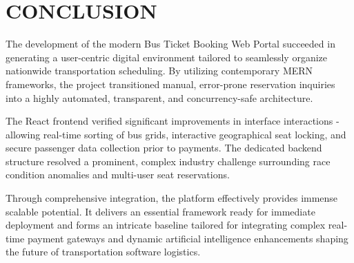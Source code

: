 \chapter{CONCLUSION}

The development of the modern Bus Ticket Booking Web Portal succeeded in generating a user-centric digital environment tailored to seamlessly organize nationwide transportation scheduling. By utilizing contemporary MERN frameworks, the project transitioned manual, error-prone reservation inquiries into a highly automated, transparent, and concurrency-safe architecture.

The React frontend verified significant improvements in interface interactions - allowing real-time sorting of bus grids, interactive geographical seat locking, and secure passenger data collection prior to payments. The dedicated backend structure resolved a prominent, complex industry challenge surrounding race condition anomalies and multi-user seat reservations.

Through comprehensive integration, the platform effectively provides immense scalable potential. It delivers an essential framework ready for immediate deployment and forms an intricate baseline tailored for integrating complex real-time payment gateways and dynamic artificial intelligence enhancements shaping the future of transportation software logistics.
